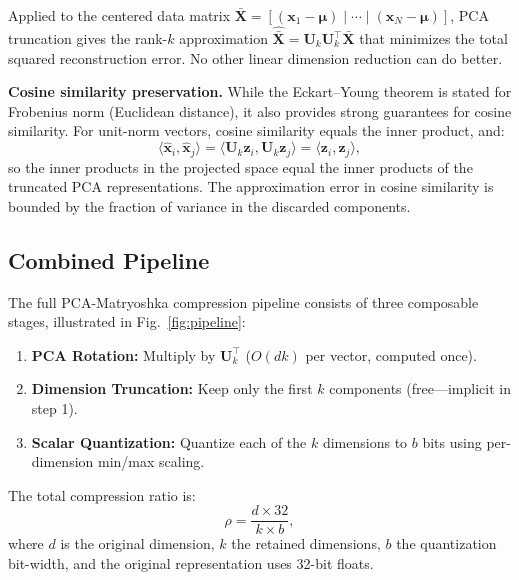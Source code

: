 \documentclass[journal]{IEEEtran}
\begin{document}
Applied to the centered data matrix $\bar{\mathbf{X}} = [(\mathbf{x}_1 - \boldsymbol{\mu}) \mid \cdots \mid (\mathbf{x}_N - \boldsymbol{\mu})]$, PCA truncation gives the rank-$k$ approximation $\hat{\bar{\mathbf{X}}} = \mathbf{U}_k \mathbf{U}_k^\top \bar{\mathbf{X}}$ that minimizes the total squared reconstruction error.
No other linear dimension reduction can do better.

\textbf{Cosine similarity preservation.}
While the Eckart--Young theorem is stated for Frobenius norm (Euclidean distance), it also provides strong guarantees for cosine similarity.
For unit-norm vectors, cosine similarity equals the inner product, and:
\begin{equation}
  \langle \hat{\mathbf{x}}_i, \hat{\mathbf{x}}_j \rangle = \langle \mathbf{U}_k \mathbf{z}_i, \mathbf{U}_k \mathbf{z}_j \rangle = \langle \mathbf{z}_i, \mathbf{z}_j \rangle,
\end{equation}
so the inner products in the projected space equal the inner products of the truncated PCA representations.
The approximation error in cosine similarity is bounded by the fraction of variance in the discarded components.

\subsection{Combined Pipeline}
\label{sec:pipeline}

The full PCA-Matryoshka compression pipeline consists of three composable stages, illustrated in Fig.~\ref{fig:pipeline}:

\begin{enumerate}
  \item \textbf{PCA Rotation:} Multiply by $\mathbf{U}_k^\top$ ($O(dk)$ per vector, computed once).
  \item \textbf{Dimension Truncation:} Keep only the first $k$ components (free---implicit in step 1).
  \item \textbf{Scalar Quantization:} Quantize each of the $k$ dimensions to $b$ bits using per-dimension min/max scaling.
\end{enumerate}

The total compression ratio is:
\begin{equation}
  \rho = \frac{d \times 32}{k \times b},
  \label{eq:ratio}
\end{equation}
where $d$ is the original dimension, $k$ the retained dimensions, $b$ the quantization bit-width, and the original representation uses 32-bit floats.
\end{document}
